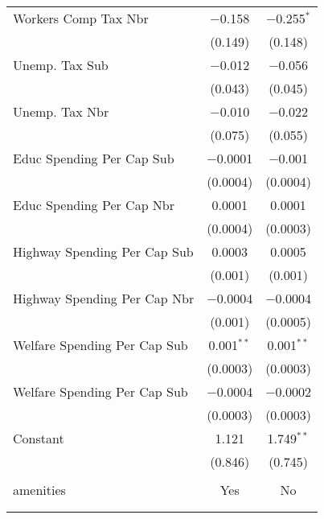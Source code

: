 \begin{table}[!htbp]
\begin{tabular}{@{\extracolsep{5pt}}lcc}
  Workers Comp Tax Nbr & $-$0.158 & $-$0.255$^{*}$ \\ 
  & (0.149) & (0.148) \\ 
  Unemp. Tax Sub & $-$0.012 & $-$0.056 \\ 
  & (0.043) & (0.045) \\ 
  Unemp. Tax Nbr & $-$0.010 & $-$0.022 \\ 
  & (0.075) & (0.055) \\ 
  Educ Spending Per Cap Sub & $-$0.0001 & $-$0.001 \\ 
  & (0.0004) & (0.0004) \\ 
  Educ Spending Per Cap Nbr & 0.0001 & 0.0001 \\ 
  & (0.0004) & (0.0003) \\ 
  Highway Spending Per Cap Sub & 0.0003 & 0.0005 \\ 
  & (0.001) & (0.001) \\ 
  Highway Spending Per Cap Nbr & $-$0.0004 & $-$0.0004 \\ 
  & (0.001) & (0.0005) \\ 
  Welfare Spending Per Cap Sub & 0.001$^{**}$ & 0.001$^{**}$ \\ 
  & (0.0003) & (0.0003) \\ 
  Welfare Spending Per Cap Sub & $-$0.0004 & $-$0.0002 \\ 
  & (0.0003) & (0.0003) \\ 
  Constant & 1.121 & 1.749$^{**}$ \\ 
  & (0.846) & (0.745) \\ 
 \hline \\[-1.8ex] 
amenities & Yes & No \\ 
\hline \\[-1.8ex] 
\hline 
\hline \\[-1.8ex] 
\end{tabular} 
\end{table} 
